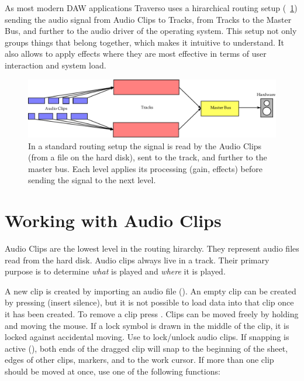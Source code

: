As most modern DAW applications Traverso uses a hirarchical routing setup (\FigB~\ref{fig_routing01}) sending the audio signal from Audio Clips to Tracks, from Tracks to the Master Bus, and further to the audio driver of the operating system. This setup not only groups things that belong together, which makes it intuitive to understand. It also allows to apply effects where they are most effective in terms of user interaction and system load.

\begin{figure}[t]
 \centering\includegraphics[width=\textwidth]{../images/routing1}
 \caption{In a standard routing setup the signal is read by the Audio Clips (from a file on the hard disk), sent to the track, and further to the master bus. Each level applies its processing (gain, effects) before sending the signal to the next level.}
 \label{fig_routing01}
\end{figure}

\section{Working with Audio Clips}
Audio Clips are the lowest level in the routing hirarchy. They represent audio files read from the hard disk. Audio clips always live in a track. Their primary purpose is to determine \emph{what} is played and \emph{where} it is played.

A new clip is created by importing an audio file (). An empty clip can be created by pressing  (insert silence), but it is not possible to load data into that clip once it has been created. To remove a clip press . Clips can be moved freely by holding  and moving the mouse. If a lock symbol is drawn in the middle of the clip, it is locked against accidental moving. Use  to lock/unlock audio clips. If snapping is active (), both ends of the dragged clip will snap to the beginning of the sheet, edges of other clips, markers, and to the work cursor. If more than one clip should be moved at once, use one of the following functions:


